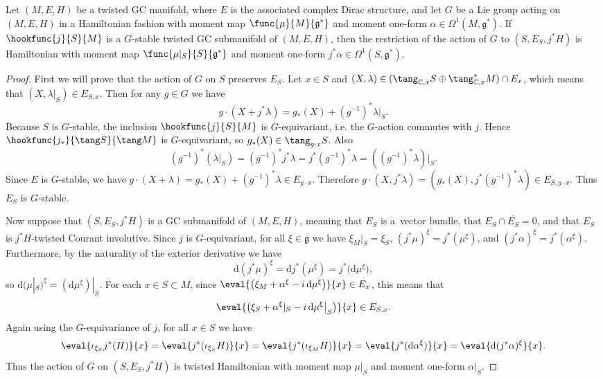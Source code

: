 \begin{Theorem} \label{thm6}
Let $(M,E,H)$ be a twisted GC manifold, where $E$ is the associated complex Dirac structure, and let $G$ be a Lie group acting on $(M,E,H)$ in a Hamiltonian fashion with moment map $\func{\mu}{M}{\mathfrak{g}^*}$ and moment one-form $\alpha \in \Omega^1(M,\mathfrak{g}^*)$.
If $\hookfunc{j}{S}{M}$ is a $G$-stable twisted GC submanifold of $(M,E,H)$, then the restriction of the action of $G$ to $(S,E_S,j^* H)$ is Hamiltonian with moment map $\func{\mu|_S}{S}{\mathfrak{g}^*}$ and moment one-form $j^* \alpha \in \Omega^1(S,\mathfrak{g}^*)$.
\end{Theorem}


\begin{proof}
First we will prove that the action of $G$ on $S$ preserves $E_S$.  Let $x \in S$ and $(X, \lambda) \in (\tang_{\mathbb{C}, x} S \oplus \tang_{\mathbb{C}, x}^{\ast} M) \cap E_x$, which means that $(X, \lambda|_S) \in E_{S,x}$.  Then for any $g \in G$ we have
\[
  g \cdot (X + j^* \lambda) = g_* (X) + (g^{-1})^* \lambda|_S.
\]
Because $S$ is $G$-stable, the inclusion $\hookfunc{j}{S}{M}$ is $G$-equivariant, i.e. the $G$-action commutes with $j$.  Hence $\hookfunc{j_*}{\tang S}{\tang M}$ is $G$-equivariant, so $g_* (X) \in \tang_{g \cdot x} S$.  Also
\[
  (g^{-1})^* \left( \lambda|_S \right)
  =
  (g^{-1})^* j^* \lambda
  =
  j^* (g^{-1})^* \lambda
  =
  \left( (g^{-1})^* \lambda \right)|_S.
\]
Since $E$ is $G$-stable, we have $g \cdot (X + \lambda) = g_* (X) + (g^{-1})^* \lambda \in E_{g \cdot x}$.  Therefore $g \cdot (X, j^* \lambda) = \left( g_* (X), j^* (g^{-1})^* \lambda \right) \in E_{S, g \cdot x}$.  Thus $E_S$ is $G$-stable.


Now suppose that $(S,E_S,j^* H)$ is a GC submanifold of $(M,E,H)$, meaning that $E_S$ is a~vector bundle, that $E_S \cap \overline{E_S} = 0$, and that $E_S$ is $j^* H$-twisted Courant involutive.  Since $j$ is $G$-equivariant, for all $\xi \in \mathfrak{g}$ we have $\xi_M|_S = \xi_S$, $(j^* \mu)^{\xi} = j^* (\mu^{\xi})$, and $(j^* \alpha)^{\xi} = j^* (\alpha^{\xi})$.  Furthermore, by the naturality of the exterior derivative we have
\[
  \mathrm{d} (j^* \mu)^{\xi}
  =
  \mathrm{d} j^* (\mu^{\xi})
  =
  j^* \big(\mathrm{d} \mu^{\xi}\big),
\]
so $\mathrm{d} (\mu|_{S})^{\xi} = (\mathrm{d} \mu^{\xi})|_S$.  For each $x \in S \subset M$, since $\eval{\left( \xi_M + \alpha^{\xi} - i \, \mathrm{d} \mu^{\xi} \right)}{x} \in E_x$, this means that
\[
  \eval{\big( \xi_S + \alpha^{\xi}|_S - i \, \mathrm{d} \mu^{\xi}\big|_S \big)}{x} \in E_{S,x}.
\]
Again using the $G$-equivariance of $j$, for all $x \in S$ we have
\[
  \eval{\iota_{\xi_S} j^* (H)}{x}
  =
  \eval{j^* (\iota_{\xi_S} H)}{x}
  =
  \eval{j^* (\iota_{\xi_M} H)}{x}
  =
  \eval{j^* (\mathrm{d} \alpha^{\xi})}{x}
  =
  \eval{\mathrm{d} (j^* \alpha)^{\xi}}{x}.
\]
Thus the action of $G$ on $(S,E_S,j^* H)$ is twisted Hamiltonian with moment map $\mu|_S$ and moment one-form $\alpha|_S$.
\end{proof}


